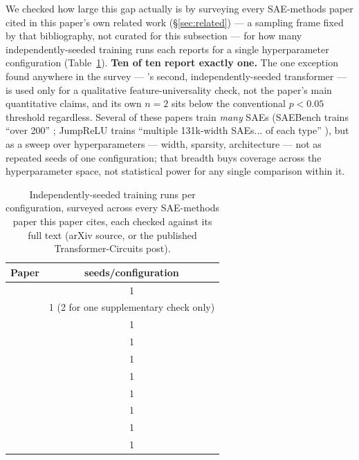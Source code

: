 \documentclass[11pt]{article}
\begin{document}
We checked how large this gap actually is by surveying every SAE-methods
paper cited in this paper's own related work (\S\ref{sec:related}) --- a
sampling frame fixed by that bibliography, not curated for this
subsection --- for how many independently-seeded training runs each
reports for a single hyperparameter configuration
(Table~\ref{tab:seedsurvey}). \textbf{Ten of ten report exactly one.} The
one exception found anywhere in the survey ---
\citet{bricken2023monosemanticity}'s second, independently-seeded
transformer --- is used only for a qualitative feature-universality check,
not the paper's main quantitative claims, and its own $n=2$ sits below the
conventional $p<0.05$ threshold regardless. Several of these papers train
\emph{many} SAEs (SAEBench trains ``over 200''
\citep{karvonen2025saebenchcomprehensivebenchmarksparse}; JumpReLU trains
``multiple 131k-width SAEs... of each type''
\citep{rajamanoharan2024jumprelu}), but as a sweep over hyperparameters ---
width, sparsity, architecture --- not as repeated seeds of one
configuration; that breadth buys coverage across the hyperparameter space,
not statistical power for any single comparison within it.

\begin{table}[h]
\centering
\caption{Independently-seeded training runs per configuration, surveyed
across every SAE-methods paper this paper cites, each checked against its
full text (arXiv source, or the published Transformer-Circuits post).}
\label{tab:seedsurvey}
\begin{tabular}{lc}
\toprule
Paper & seeds/configuration \\
\midrule
\citet{cunningham2023sparse} & 1 \\
\citet{bricken2023monosemanticity} & 1 (2 for one supplementary check only) \\
\citet{templeton2024scaling} & 1 \\
\citet{gao2024scalingevaluatingsparseautoencoders} & 1 \\
\citet{rajamanoharan2024gated} & 1 \\
\citet{rajamanoharan2024jumprelu} & 1 \\
\citet{bussmann2024batchtopk} & 1 \\
\citet{karvonen2025saebenchcomprehensivebenchmarksparse} & 1 \\
\citet{marks2025sparsefeaturecircuitsdiscovering} & 1 \\
\citet{lu2025sparseautoencodersagain} & 1 \\
\bottomrule
\end{tabular}

\end{table}
\end{document}
